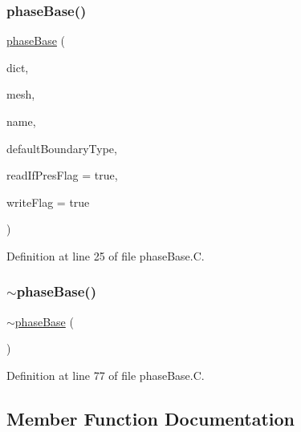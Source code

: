 \subsubsection{\texorpdfstring{phase\+Base()}{phaseBase()}}
{\footnotesize\ttfamily \hyperlink{classFoam_1_1phaseBase}{phase\+Base} (\begin{DoxyParamCaption}\item[{const dictionary \&}]{dict,  }\item[{const fv\+Mesh \&}]{mesh,  }\item[{const word \&}]{name,  }\item[{const word \&}]{default\+Boundary\+Type,  }\item[{bool}]{read\+If\+Pres\+Flag = {\ttfamily true},  }\item[{bool}]{write\+Flag = {\ttfamily true} }\end{DoxyParamCaption})}



Definition at line 25 of file phase\+Base.\+C.

\mbox{\label{classFoam_1_1phaseBase_af9e7a74fa09767bb0bcce68a0389e363}} 
\subsubsection{\texorpdfstring{$\sim$phase\+Base()}{~phaseBase()}}
{\footnotesize\ttfamily $\sim$\hyperlink{classFoam_1_1phaseBase}{phase\+Base} (\begin{DoxyParamCaption}{ }\end{DoxyParamCaption})\hspace{0.3cm}{\ttfamily [virtual]}}



Definition at line 77 of file phase\+Base.\+C.



\subsection{Member Function Documentation}
\mbox{\label{classFoam_1_1phaseBase_a470f06cfb9b6ee887cd85d63de275607}} 
